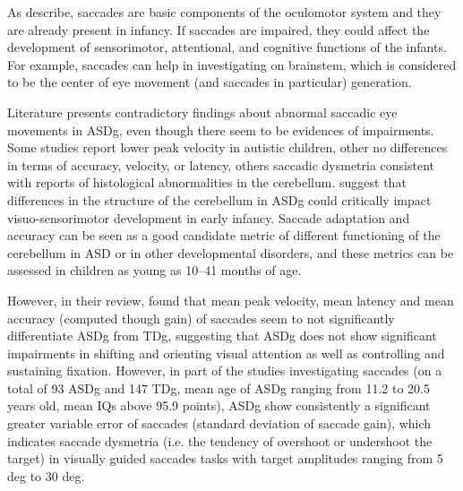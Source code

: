 As \cite{pensiero2009saccades} describe, saccades are basic components of the oculomotor system and they are already present in infancy. If saccades are impaired, they could affect the development of sensorimotor, attentional, and cognitive functions of the infants. For example, saccades can help in investigating on brainstem, which is considered to be the center of eye movement (and saccades in particular) generation.

Literature presents contradictory findings about abnormal saccadic eye movements in ASDg, even though there seem to be evidences of impairments. Some studies report lower peak velocity in autistic children, other no differences in terms of accuracy, velocity, or latency, others saccadic dysmetria consistent with reports of histological abnormalities in the cerebellum. \cite{freedman2017biomarkers} suggest that differences in the structure of the cerebellum in ASDg could critically impact visuo-sensorimotor development in early infancy. Saccade adaptation and accuracy can be seen as a good candidate metric of different functioning of the cerebellum in ASD or in other developmental disorders, and these metrics can be assessed in children as young as 10–41 months of age.

However, in their review, \cite{johnson2016review} found that mean peak velocity, mean latency and mean accuracy (computed though gain) of saccades seem to not significantly differentiate ASDg from TDg, suggesting that ASDg does not show significant impairments in shifting and orienting visual attention as well as controlling and sustaining fixation. However, in part of the studies investigating saccades (on a total of 93 ASDg and 147 TDg, mean age of ASDg ranging from 11.2 to 20.5 years old, mean IQs above 95.9 points), ASDg show consistently a significant greater variable error of saccades (standard deviation of saccade gain), which indicates saccade dysmetria (i.e. the tendency of overshoot or undershoot the target) in visually guided saccades tasks with target amplitudes ranging from 5 deg to 30 deg.

